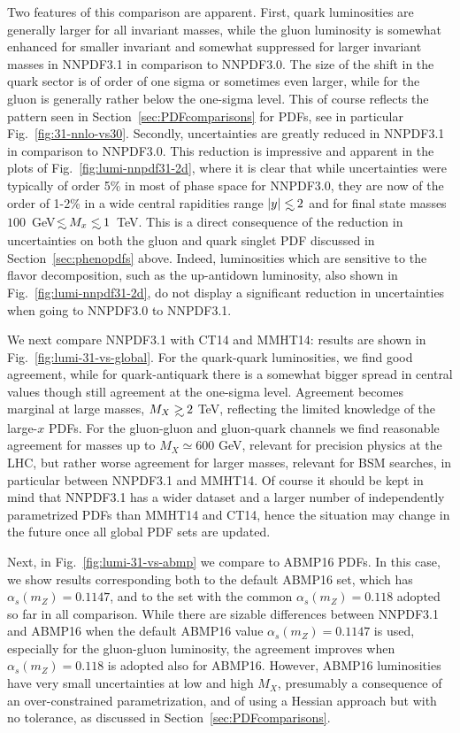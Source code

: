 Two features of this comparison are apparent. First, quark
luminosities are generally larger for all invariant masses, while the
gluon luminosity is somewhat enhanced for smaller invariant and
somewhat suppressed for  larger invariant masses in
NNPDF3.1 in comparison to NNPDF3.0.
The size of the shift in the quark sector is of order of one sigma or
sometimes even larger, while for the gluon is generally rather below
the one-sigma level. This of course reflects the pattern seen in
Section~\ref{sec:PDFcomparisons} for PDFs,
see in particular Fig.~\ref{fig:31-nnlo-vs30}.
Secondly, uncertainties are greatly reduced in NNPDF3.1 in comparison to
NNPDF3.0. This reduction is impressive and apparent in the plots of
Fig.~\ref{fig:lumi-nnpdf31-2d}, where it is clear that while
uncertainties were typically of order 5\% in most of phase space for
NNPDF3.0, they are now of the order of 1-2\% in a wide central
rapidities range
$|y|\lsim 2$ and for final state masses $100$~GeV$\lsim M_x\lsim 1$~TeV.
This is a direct consequence of  the reduction in uncertainties on both the
gluon and quark singlet PDF discussed in Section~\ref{sec:phenopdfs}
above. Indeed, luminosities which are sensitive to the flavor
decomposition, such as the up-antidown luminosity, also shown in
Fig.~\ref{fig:lumi-nnpdf31-2d}, do not display a significant reduction
in uncertainties when going to NNPDF3.0 to NNPDF3.1.


We next compare  NNPDF3.1 with CT14 and MMHT14: results are 
shown in Fig.~\ref{fig:lumi-31-vs-global}.
For the quark-quark luminosities, we find good agreement, while
for quark-antiquark  there is a somewhat bigger spread in central
values though still  agreement at the one-sigma level.
Agreement becomes marginal at large masses, $M_X\gsim 2$ TeV, reflecting
the limited knowledge of the large-$x$  PDFs. For the 
gluon-gluon and gluon-quark  channels
we find reasonable agreement for masses up to $M_X\simeq 600$ GeV, relevant for 
precision physics at the LHC, but rather worse agreement for larger
masses, relevant for BSM searches,
in particular between NNPDF3.1 and MMHT14.
%
Of course it should be kept in mind that NNPDF3.1 has a wider
dataset and a larger number of independently parametrized PDFs than
MMHT14 and CT14, hence the situation may change in the future once
all global PDF sets are updated.

Next, in Fig.~\ref{fig:lumi-31-vs-abmp} we compare to
ABMP16 PDFs. In this case, we show results corresponding both to the
default ABMP16 set, which has  $\alpha_s(m_Z)=0.1147$, and to the set with
the common  $\alpha_s(m_Z)=0.118$ adopted so far in all comparison.
     While there
     are sizable differences between NNPDF3.1 and ABMP16 when
     the default ABMP16 value  $\alpha_s(m_Z)=0.1147$ is used, especially for 
     the gluon-gluon luminosity, the agreement improves when
     $\alpha_s(m_Z)=0.118$ is adopted also for ABMP16. 
   However, ABMP16 luminosities have very small uncertainties
  at low and high $M_X$, presumably a consequence of an
  over-constrained parametrization, and of using a Hessian approach
  but with no tolerance, as discussed in Section~\ref{sec:PDFcomparisons}.

